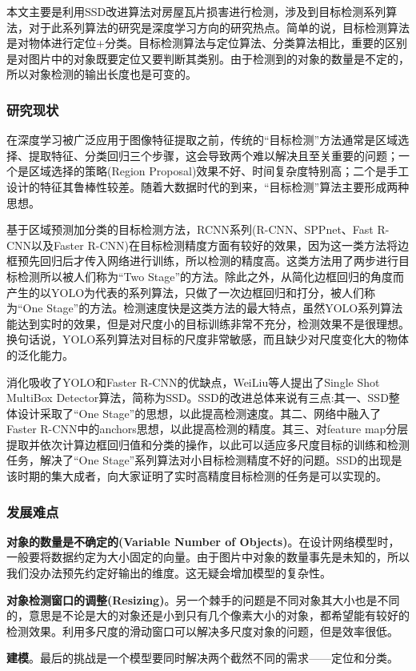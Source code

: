 本文主要是利用SSD改进算法对房屋瓦片损害进行检测，涉及到目标检测系列算法，对于此系列算法的研究是深度学习方向的研究热点。简单的说，目标检测算法是对物体进行定位+分类。目标检测算法与定位算法、分类算法相比，重要的区别是对图片中的对象既要定位又要判断其类别。由于检测到的对象的数量是不定的，所以对象检测的输出长度也是可变的。

\subsubsection{研究现状}
在深度学习被广泛应用于图像特征提取之前，传统的“目标检测”方法通常是区域选择、提取特征、分类回归三个步骤\cite{hkq}，这会导致两个难以解决且至关重要的问题；一个是区域选择的策略(Region Proposal)效果不好、时间复杂度特别高；二个是手工设计的特征其鲁棒性较差。随着大数据时代的到来，“目标检测”算法主要形成两种思想。

基于区域预测加分类的目标检测方法，RCNN系列(R-CNN\cite{rcnn}、SPPnet\cite{sppnet}、Fast R-CNN\cite{fastrcnn}以及Faster R-CNN\cite{fasterrcnn})在目标检测精度方面有较好的效果，因为这一类方法将边框预先回归后才传入网络进行训练，所以检测的精度高。这类方法用了两步进行目标检测所以被人们称为“Two Stage”的方法。除此之外，从简化边框回归的角度而产生的以YOLO\cite{yolo}为代表的系列算法，只做了一次边框回归和打分，被人们称为“One Stage”的方法。检测速度快是这类方法的最大特点，虽然YOLO系列算法能达到实时的效果，但是对尺度小的目标训练非常不充分，检测效果不是很理想。换句话说，YOLO系列算法对目标的尺度非常敏感，而且缺少对尺度变化大的物体的泛化能力。

消化吸收了YOLO和Faster R-CNN的优缺点，WeiLiu等人提出了Single Shot MultiBox Detector\cite{ssd}算法，简称为SSD。SSD的改进总体来说有三点:其一、SSD整体设计采取了“One Stage”的思想，以此提高检测速度。其二、网络中融入了Faster R-CNN\cite{fasterrcnn}中的anchors思想，以此提高检测的精度。其三、对feature map分层提取并依次计算边框回归值和分类的操作，以此可以适应多尺度目标的训练和检测任务，解决了“One Stage”系列算法对小目标检测精度不好的问题。SSD的出现是该时期的集大成者，向大家证明了实时高精度目标检测的任务是可以实现的。

\subsubsection{发展难点}
\textbf{对象的数量是不确定的(Variable Number of Objects)}。在设计网络模型时，一般要将数据约定为大小固定的向量。由于图片中对象的数量事先是未知的，所以我们没办法预先约定好输出的维度。这无疑会增加模型的复杂性。

\textbf{对象检测窗口的调整(Resizing)}。另一个棘手的问题是不同对象其大小也是不同的，意思是不论是大的对象还是小到只有几个像素大小的对象，都希望能有较好的检测效果。利用多尺度的滑动窗口可以解决多尺度对象的问题，但是效率很低。

\textbf{建模}。最后的挑战是一个模型要同时解决两个截然不同的需求——定位和分类。
